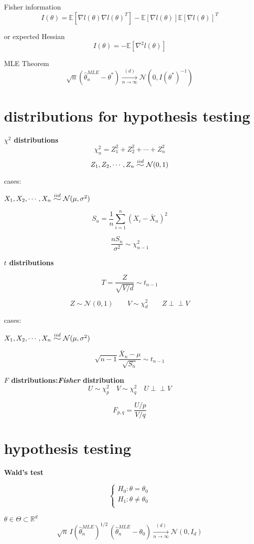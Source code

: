 \documentclass[12pt,a4paper]{article}
\newcommand{\widesim}[2][1.5]{
  \mathrel{\overset{#2}{\scalebox{#1}[1]{$\sim$}}}
}
\newcommand{\indep}{\perp \!\!\! \perp}
\begin{document}
Fisher information
\[
	I(\theta) = \mathbb{E}[\nabla l(\theta)\nabla l(\theta)^T]-\mathbb{E}[\nabla l(\theta)]\mathbb{E}[\nabla l(\theta)]^T
\]

or expected Hessian
\[
	I(\theta) = -\mathbb{E}[\nabla^2 l(\theta)]
\]

MLE Theorem
\[
	\sqrt{n}\left(\hat{\theta}_{n}^{MLE} - \theta^*\right) \xrightarrow[n \rightarrow \infty]{(d)} \mathcal{N}\left(0,I(\theta^*)^{-1}\right)
\]


\section{distributions for hypothesis testing}
\textbf{$\chi^2$ distributions}
\[
\chi^2_n = Z^2_1+Z^2_2+\cdots+Z^2_n
\]
\[
Z_1,Z_2,\cdots,Z_n \widesim{iid} \mathcal{N}(0,1)
\]

cases:

$X_1,X_2,\cdots,X_n \widesim{iid} \mathcal{N}(\mu,\sigma^2)$

\[
	S_n = \frac{1}{n}\sum_{i=1}^{n}(X_i-\bar{X}_n)^2
\]

\[
	\frac{nS_n}{\sigma^2} \sim \chi^2_{n-1}
\]

\noindent\textbf{$t$ distributions}

\[
T = \frac{Z}{\sqrt{V/d}} \sim t_{n-1}
\]

\[ Z \sim \mathcal{N}(0,1) \quad\quad V \sim \chi^2_d \quad\quad Z \indep V \]

cases:

$X_1,X_2,\cdots,X_n \widesim{iid} \mathcal{N}(\mu,\sigma^2)$

\[
\sqrt{n-1}\frac{\bar{X}_n -\mu}{\sqrt{S_n}} \sim t_{n-1}
\]


\noindent\textbf{$F$ distributions:\textit{Fisher} distribution}
\[
U\sim \chi^2_p \quad V\sim \chi^2_q \quad U \indep V
\]

\[
F_{p,q} = \frac{U/p}{V/q}
\]

\section{hypothesis testing}
\hspace{\parindent}\textbf{Wald’s test} 

\[
\begin{cases}
	H_0:\theta = \theta_0 \\
	H_1:\theta \neq \theta_0 \\
\end{cases}
\]

$\theta \in \Theta \subset \mathbb{R}^d$
\[
	\sqrt{n}\,I(\hat{\theta}_{n}^{MLE})^{1/2}\,\left(\hat{\theta}_{n}^{MLE} - \theta_0\right) \xrightarrow[n \rightarrow \infty]{(d)} \mathcal{N}\left(0,I_d\right)
\]
\end{document}
